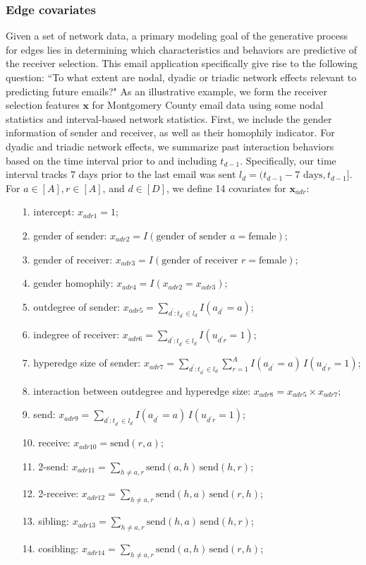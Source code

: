 \documentclass[ba]{imsart}
\numberwithin{equation}{section}
\theoremstyle{plain}
\begin{document}
 	   \subsubsection{Edge covariates}
 	   Given a set of network data, a primary modeling goal of the generative process for edges lies in determining which characteristics and behaviors are predictive of the receiver selection. This email application specifically give rise to the following question: ``To what extent are nodal, dyadic or triadic network effects relevant to predicting future emails?" As an illustrative example, we form the receiver selection features $\boldsymbol{x}$ for Montgomery County email data using some nodal statistics and interval-based network statistics. First, we include the gender information of sender and receiver, as well as their homophily indicator. For dyadic and triadic network effects, we summarize past interaction behaviors based on the time interval prior to and including $t_{d-1}$. Specifically, our time interval tracks 7 days prior to the last email was sent $l_d = (t_{d-1}-7\mbox{ days}, t_{d-1}]$. For $a \in [A], r \in [A]$, and $d \in [D]$, we define 14 covariates for $\boldsymbol{x}_{adr}$:
 	   \begin{itemize}
 	   	\item[1.] intercept: ${x}_{adr1} =1$;
 	   	 \item[2.] gender of sender: ${x}_{adr2} = I(\mbox{gender of sender } a= \mbox{female});$
 	   	 \item[3.] gender of receiver: ${x}_{adr3} = I(\mbox{gender of receiver } r= \mbox{female});$
 	   	 \item[4.] gender homophily: ${x}_{adr4} = I({x}_{adr2}={x}_{adr3});$ 	   		
 	   	\item[5.] outdegree of sender: ${x}_{adr5} =\sum_{d^\prime: t_{d^\prime} \in l_d} I(a_{d^\prime} = a)$;
 	   	\item[6.] indegree of receiver: ${x}_{adr6}=\sum_{d^\prime: t_{d^\prime} \in l_d} I(u_{d^\prime r} = 1)$;
 	   	\item[7.] hyperedge size of sender: ${x}_{adr7}=\sum_{d^\prime: t_{d^\prime} \in l_d} \sum_{r=1}^A I(a_{d^\prime} = a)\,I(u_{d^\prime r} = 1)$;
 	  \item[8.] interaction between outdegree and hyperedge size: ${x}_{adr8} = {x}_{adr5}\times{x}_{adr7};$
 	   	\item[9.] send: ${x}_{adr9}=\sum_{d^\prime: t_{d^\prime} \in l_d} I(a_{d^\prime} = a)\,I(u_{d^\prime r} = 1)$;
 	   	\item[10.] receive: ${x}_{adr10}=\mbox{send}(r,a)$;
 	   	\item[11.] 2-send: ${x}_{adr11} = \sum_{h \neq a, r} \mbox{send}(a,h)\,\mbox{send}(h,r)$;
 	   	\item[12.] 2-receive: ${x}_{adr12}= \sum_{h \neq a, r} \mbox{send}(h,a)\,\mbox{send}(r,h)$;
 	   	\item[13.] sibling: ${x}_{adr13}=\sum_{h \neq a, r} \mbox{send}(h,a)\,\mbox{send}(h,r)$;
 	   	\item[14.] cosibling: ${x}_{adr14}=\sum_{h \neq a, r} \mbox{send}(a,h)\,\mbox{send}(r,h)$;
 	 	   \end{itemize}
\end{document}
